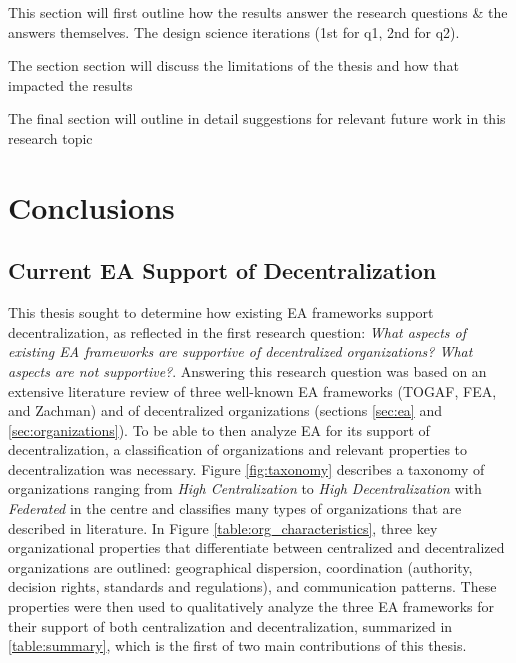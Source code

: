 This section will first outline how the results answer the research questions \& the answers themselves. The design science iterations (1st for q1, 2nd for q2).



The section section will discuss the limitations of the thesis and how that impacted the results


The final section will outline in detail suggestions for relevant future work in this research topic 



\section{Conclusions}
\label{sec:conclusions}

\subsection{Current EA Support of Decentralization}

This thesis sought to determine how existing EA frameworks support decentralization, as reflected in the first research question: \textit{What aspects of existing EA frameworks are supportive of decentralized organizations? What aspects are not supportive?}. Answering this research question was based on an extensive literature review of three well-known EA frameworks (TOGAF, FEA, and Zachman) and of decentralized organizations (sections \ref{sec:ea} and \ref{sec:organizations}). To be able to then analyze EA for its support of decentralization, a classification of organizations and relevant properties to decentralization was necessary. Figure \ref{fig:taxonomy} describes a taxonomy of organizations ranging from \textit{High Centralization} to \textit{High Decentralization} with \textit{Federated} in the centre and classifies many types of organizations that are described in literature. In Figure \ref{table:org_characteristics}, three key organizational properties that differentiate between centralized and decentralized organizations are outlined: geographical dispersion, coordination (authority, decision rights, standards and regulations), and communication patterns. These properties were then used to qualitatively analyze the three EA frameworks for their support of both centralization and decentralization, summarized in \ref{table:summary}, which is the first of two main contributions of this thesis.

